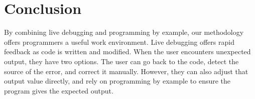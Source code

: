 \section{Conclusion}
By combining live debugging and programming by example,
our methodology offers programmers a useful work environment.
Live debugging offers rapid feedback as code is written and modified. 
When the user encounters unexpected output, they have two options.
The user can go back to the code, detect
the source of the error, and correct it manually.
However, they can also adjust that output value directly,
and rely on programming by example to ensure the program gives the expected output.
